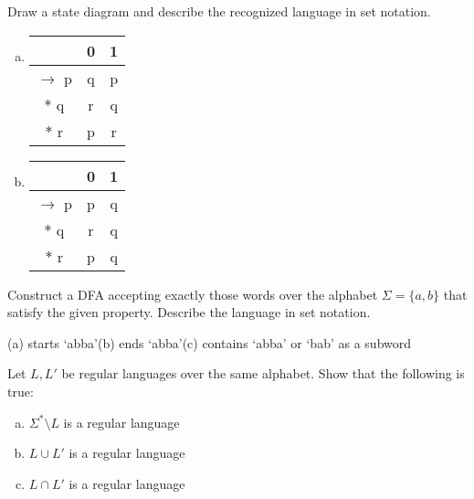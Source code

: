 \documentclass[a4paper,12pt]{amsart}
\begin{document}
\medskip\begin{problem}

    Draw a state diagram and describe the recognized language in set notation.

    \begin{multicols}{2}
        
        \begin{enumerate}[(a)]

            \item \begin{tabular}{ c | c c }
            & 0 & 1 \\   \hline
            $\to$ p & q & p \\  
            $\ast$ q & r & q\\
            $\ast$ r & p & r
            \end{tabular}
    
        \columnbreak
    
            \item \begin{tabular}{ c | c c }
            & 0 & 1 \\   \hline
            $\to$ p & p & q \\  
            $\ast$ q & r & q\\
            $\ast$ r & p & q
            \end{tabular}

        \end{enumerate}

    \end{multicols}

\end{problem}


\medskip\begin{problem}

    Construct a DFA accepting exactly those words over the alphabet $\Sigma=\{a,b\}$ that satisfy the given property. Describe the language in set notation.

    \medskip
    
    (a) starts `abba'\hfill (b) ends `abba'\hfill (c) contains `abba' or `bab' as a subword
\end{problem}


\medskip\begin{problem}

    Let $L,L'$ be regular languages over the same alphabet. Show that the following is true:
  
    \medskip
    
    \begin{enumerate}[(a)]\setlength\itemsep{6pt}
        \item $\Sigma^*\setminus L$ is a regular language
        \item $L\cup L'$ is a regular language
        \item $L\cap L'$ is a regular language        
    \end{enumerate}
      
\end{problem}
\end{document}
